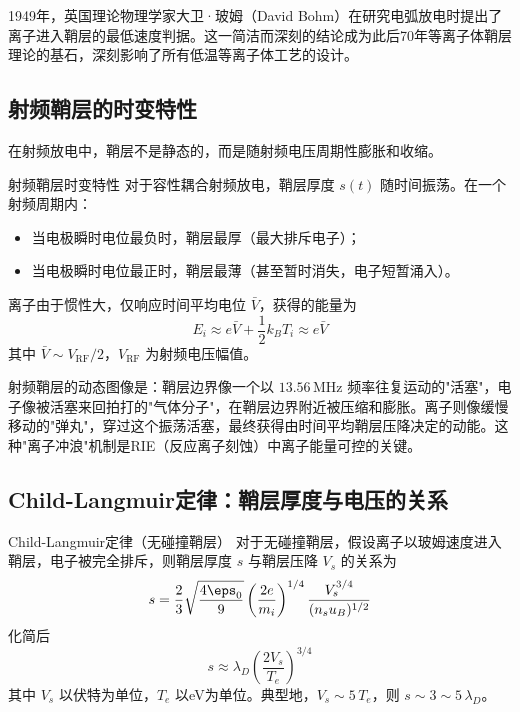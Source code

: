 \begin{history}{}{}
1949年，英国理论物理学家大卫·玻姆（David Bohm）在研究电弧放电时提出了离子进入鞘层的最低速度判据。这一简洁而深刻的结论成为此后70年等离子体鞘层理论的基石，深刻影响了所有低温等离子体工艺的设计。
\end{history}

\subsection{射频鞘层的时变特性}

在射频放电中，鞘层不是静态的，而是随射频电压周期性膨胀和收缩。

\begin{theorem}{射频鞘层时变特性}{}{}
\label{thm:rf-sheath}
对于容性耦合射频放电，鞘层厚度 $s(t)$ 随时间振荡。在一个射频周期内：
\begin{itemize}
\item 当电极瞬时电位最负时，鞘层最厚（最大排斥电子）；
\item 当电极瞬时电位最正时，鞘层最薄（甚至暂时消失，电子短暂涌入）。
\end{itemize}
离子由于惯性大，仅响应时间平均电位 $\bar{V}$，获得的能量为
\begin{equation}
\label{eq:ion-energy-rf}
E_i \approx e\bar{V} + \frac{1}{2}k_B T_i \approx e\bar{V}
\end{equation}
其中 $\bar{V} \sim V_{\text{RF}}/2$，$V_{\text{RF}}$ 为射频电压幅值。
\end{theorem}

\begin{insight}{}{}
射频鞘层的动态图像是：鞘层边界像一个以 $13.56\,\mathrm{MHz}$ 频率往复运动的"活塞"，电子像被活塞来回拍打的"气体分子"，在鞘层边界附近被压缩和膨胀。离子则像缓慢移动的"弹丸"，穿过这个振荡活塞，最终获得由时间平均鞘层压降决定的动能。这种"离子冲浪"机制是RIE（反应离子刻蚀）中离子能量可控的关键。
\end{insight}

\subsection{Child-Langmuir定律：鞘层厚度与电压的关系}

\begin{theorem}{Child-Langmuir定律（无碰撞鞘层）}{}{}
\label{thm:child-langmuir}
对于无碰撞鞘层，假设离子以玻姆速度进入鞘层，电子被完全排斥，则鞘层厚度 $s$ 与鞘层压降 $V_s$ 的关系为
\begin{equation}
\label{eq:child-langmuir}
s = \frac{2}{3}\sqrt{\frac{4\eps_0}{9}} \left(\frac{2e}{m_i}\right)^{1/4} \frac{V_s^{3/4}}{(n_s u_B)^{1/2}}
\end{equation}
化简后
\begin{equation}
s \approx \lambda_D \left(\frac{2V_s}{T_e}\right)^{3/4}
\end{equation}
其中 $V_s$ 以伏特为单位，$T_e$ 以eV为单位。典型地，$V_s \sim 5\,T_e$，则 $s \sim 3\sim 5\,\lambda_D$。
\end{theorem}

